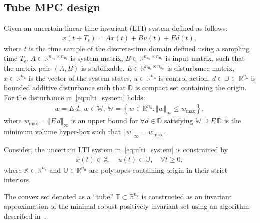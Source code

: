 \documentclass[letterpaper, 10 pt, conference]{ieeeconf}
\begin{document}
	\subsection{Tube MPC design}
	\label{sec:tube_mpc}
	
	Given an uncertain linear time-invariant (LTI) system defined as follows:
	\begin{eqnarray}
		\label{eq:ulti_system}
		x(t+T_{\mathrm{s}}) = A x(t) + B u(t) + E d(t), %
	\end{eqnarray}
	where $t$ is the time sample of the discrete-time domain defined using a sampling time $T_{\mathrm{s}}$. $A \in \mathbb{R}^{n_{\mathrm{n}_{x}} \times n_{\mathrm{n}_{x}}}$ is system matrix, $B \in \mathbb{R}^{n_{\mathrm{n}_{x}} \times n_{\mathrm{n}_{u}}}$ is input matrix, such that the matrix pair $(A,B)$ is stabilizable. $E \in \mathbb{R}^{n_{\mathrm{n}_{x}} \times n_{\mathrm{n}_{w}}}$ is disturbance matrix, $x \in \mathbb{R}^{n_{\mathrm{x}}}$ is the vector of the system states, $u \in \mathbb{R}^{n_{\mathrm{u}}}$ is control action, $d \in \mathbb{D} \subset \mathbb{R}^{n_{\mathrm{x}}}$ is bounded additive disturbance such that $\mathbb{D}$ is compact set containing the origin. 
	For the disturbance in~\eqref{eq:ulti_system} holds:
	\begin{eqnarray}
		\label{eq:disturbance_set}
		w = E \, d, ~ w \in \mathbb{W}, ~ \mathbb{W} = \left\{ w \in \mathbb{R}^{n_{\mathrm{x}}} : \Vert w \Vert_{\infty} \leq w_{\max} \right\},
	\end{eqnarray}
	where $w_{\max} = \Vert E \, d \Vert_{\infty}$ is an upper bound for $\forall d \in \mathbb{D}$ satisfying $\mathbb{W} \supseteq E \, \mathbb{D}$ is the minimum volume hyper-box such that $\Vert w \Vert_{\infty} = w_{\max}$.
	
	Consider, the uncertain LTI system in~\eqref{eq:ulti_system} is constrained by
	\begin{eqnarray}
		\label{eq:constraints_x_u}
		x(t) \in \mathbb{X}, \quad u(t) \in \mathbb{U}, \quad \forall t \geq 0,
	\end{eqnarray}
	where $\mathbb{X} \in \mathbb{R}^{n_{\mathrm{x}}}$ and $\mathbb{U} \in \mathbb{R}^{n_{\mathrm{u}}}$ are polytopes containing origin in their strict interiors. 
	
	The convex set denoted as a ``tube'' $\mathbb{T} \subset \mathbb{R}^{n_{\mathrm{x}}}$ is constructed as an invariant approximation of the minimal robust positively invariant set using an algorithm described in~\cite{RK05}.
	
\end{document}
